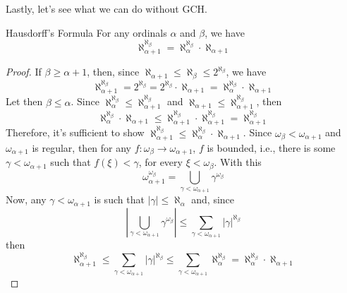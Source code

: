 Lastly, let's see what we can do without GCH.

\begin{theorem}{Hausdorff's Formula}{}
    \textbf{} For any ordinals $\alpha$ and $\beta$, we have
    $$\aleph_{\alpha+1}^{\aleph_\beta}=\aleph_\alpha^{\aleph_\beta}\cdot\aleph_{\alpha+1}$$
\end{theorem}

\begin{proof}
    If $\beta\geq\alpha+1$, then, since $\aleph_{\alpha+1}\leq\aleph_\beta\leq2^{\aleph_\beta}$, we have
    $$\aleph_{\alpha+1}^{\aleph_\beta}=2^{\aleph_\beta}=2^{\aleph_\beta}\cdot\aleph_{\alpha+1}=\aleph_\alpha^{\aleph_\beta}\cdot\aleph_{\alpha+1}$$
    Let then $\beta\leq\alpha$. Since $\aleph_\alpha^{\aleph_\beta}\leq\aleph_{\alpha+1}^{\aleph_\beta}$ and $\aleph_{\alpha+1}\leq\aleph_{\alpha+1}^{\aleph_\beta}$, then
    $$\aleph_\alpha^{\aleph_\beta}\cdot\aleph_{\alpha+1}\leq\aleph_{\alpha+1}^{\aleph_\beta}\cdot\aleph_{\alpha+1}^{\aleph_\beta}=\aleph_{\alpha+1}^{\aleph_\beta}$$
    Therefore, it's sufficient to show $\aleph_{\alpha+1}^{\aleph_\beta}\leq\aleph_\alpha^{\aleph_\beta}\cdot\aleph_{\alpha+1}$. Since $\omega_\beta<\omega_{\alpha+1}$ and $\omega_{\alpha+1}$ is regular, then for any $f:\omega_\beta\to\omega_{\alpha+1}$, $f$ is bounded, i.e., there is some $\gamma<\omega_{\alpha+1}$ such that $f(\xi)<\gamma$, for every $\xi<\omega_\beta$. With this
    $$\omega_{\alpha+1}^{\omega_\beta}=\bigcup_{\gamma<\omega_{\alpha+1}}\gamma^{\omega_\beta}$$
    Now, any $\gamma<\omega_{\alpha+1}$ is such that $|\gamma|\leq\aleph_\alpha$ and, since
    $$\left|\bigcup_{\gamma<\omega_{\alpha+1}}\gamma^{\omega_\beta}\right|\leq\sum_{\gamma<\omega_{\alpha+1}}|\gamma|^{\aleph_\beta}$$
    then
    $$\aleph_{\alpha+1}^{\aleph_\beta}\leq\sum_{\gamma<\omega_{\alpha+1}}|\gamma|^{\aleph_\beta}\leq\sum_{\gamma<\omega_{\alpha+1}}\aleph_\alpha^{\aleph_\beta}=\aleph_{\alpha}^{\aleph_\beta}\cdot\aleph_{\alpha+1}$$
\end{proof}
